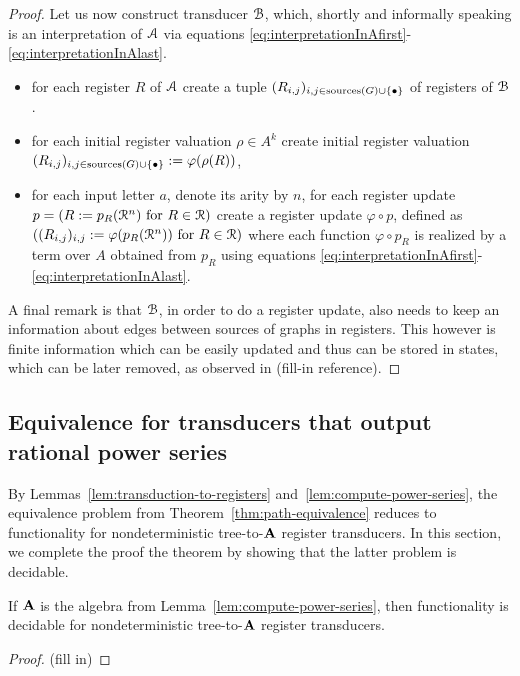 \begin{proof}
	Let us now construct transducer ${\mathcal B}$, which, shortly and informally speaking is an interpretation of ${\mathcal A}$ via equations \eqref{eq:interpretationInAfirst}-\eqref{eq:interpretationInAlast}.
	\begin{itemize}
		\item for each register $R$ of ${\mathcal A}$ create a tuple $(R_{i,j})_{i, j \in \operatorname{sources}(G) \cup \{\bullet\}}$ of registers of ${\mathcal B}$.
		\item for each initial register valuation $\rho \in A^k$ create initial register valuation $(R_{i,j})_{i,j\in\operatorname{sources}(G) \cup \{\bullet\}} := \varphi(\rho(R))$,
		\item for each input letter $a$, denote its arity by $n$, for each register update $p = (R:= p_R(\mathcal{R}^n) \text{ for } R \in \mathcal{R})$ create a register update $\varphi\circ p$, defined as $((R_{i,j})_{i,j} := \varphi(p_R(\mathcal{R}^n)) \text{ for } R\in\mathcal{R})$ where each function $\varphi\circ p_R$ is realized by a term over $A$ obtained from $p_R$ using equations \eqref{eq:interpretationInAfirst}-\eqref{eq:interpretationInAlast}.
	\end{itemize}
	A final remark is that ${\mathcal B}$, in order to do a register update, also needs to keep an information about edges between sources of graphs in registers. This however is finite information which can be easily updated and thus can be stored in states, which can be later removed, as observed in (fill-in reference).
\end{proof}

\subsection{Equivalence for transducers that output rational power series}
\label{sec:decide-power-series}
By Lemmas~\ref{lem:transduction-to-registers} and~\ref{lem:compute-power-series}, the  equivalence problem from Theorem~\ref{thm:path-equivalence} reduces to functionality for nondeterministic tree-to-$\mathbf{A}$ register transducers. In this section, we complete the proof the theorem by showing that the latter problem is decidable.
\begin{lemma}\label{lem:functionality-decidable-power-series} If $\mathbf{A}$ is the algebra from Lemma~\ref{lem:compute-power-series}, then functionality is decidable for nondeterministic tree-to-$\mathbf{A}$ register transducers. 
\end{lemma}
\begin{proof}
    (fill in)
\end{proof}

